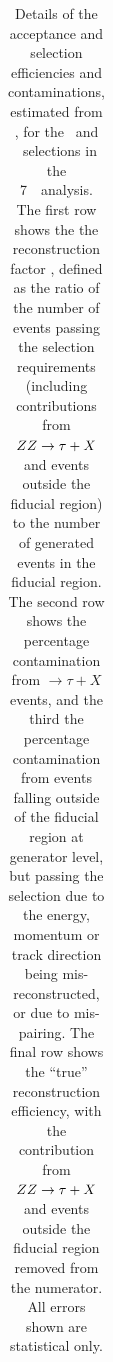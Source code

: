 \begin{table}[htbp]
\begin{tabular}{p{3.5cm}llll}
	\hline\hline
    \end{tabular}
    \caption[Details of the acceptance and selection
    efficiencies and contaminations, estimated from \mc, for the \ZZ\ and \ZZs\
    selections in the 7~\tev\ analysis.]{Details of the acceptance and selection
    efficiencies and contaminations, estimated from \mc, for the \ZZ\ and \ZZs\
    selections in the 7~\tev\ analysis. The first row shows the the
    reconstruction factor \CZZ, defined as the ratio of the number of events
    passing the selection requirements (including contributions from $ZZ
    \rightarrow \tau+X$ and events outside the fiducial region) to the number
    of generated events in the fiducial region.  The second row shows the
    percentage contamination from $\rightarrow \tau+X$ events, and the third
    the percentage contamination from events falling outside of the fiducial
    region at generator level, but passing the selection due to the energy,
    momentum or track direction being mis-reconstructed, or due to mis-pairing.  The final row shows
    the ``true'' reconstruction efficiency, with the contribution from $ZZ
    \rightarrow \tau+X$ and events outside the fiducial region removed from the
    numerator.  All errors shown are statistical only.}
    \label{table:objSel-czz-seven}
\end{table}

